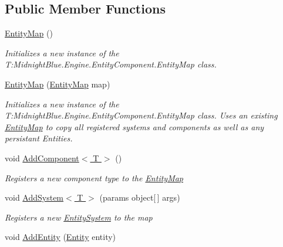 \subsection*{Public Member Functions}
\begin{DoxyCompactItemize}
\item 
\hyperlink{class_midnight_blue_1_1_engine_1_1_entity_component_1_1_entity_map_ad242ca713249280c914742d68f3c8ea4}{Entity\+Map} ()
\begin{DoxyCompactList}\small\item\em Initializes a new instance of the T\+:\+Midnight\+Blue.\+Engine.\+Entity\+Component.\+Entity\+Map class. \end{DoxyCompactList}\item 
\hyperlink{class_midnight_blue_1_1_engine_1_1_entity_component_1_1_entity_map_a7fc3f5c4ad9efde2dc878c19cf5040f5}{Entity\+Map} (\hyperlink{class_midnight_blue_1_1_engine_1_1_entity_component_1_1_entity_map}{Entity\+Map} map)
\begin{DoxyCompactList}\small\item\em Initializes a new instance of the T\+:\+Midnight\+Blue.\+Engine.\+Entity\+Component.\+Entity\+Map class. Uses an existing \hyperlink{class_midnight_blue_1_1_engine_1_1_entity_component_1_1_entity_map}{Entity\+Map} to copy all registered systems and components as well as any persistant Entities. \end{DoxyCompactList}\item 
void \hyperlink{class_midnight_blue_1_1_engine_1_1_entity_component_1_1_entity_map_aa4b52e535a775a3649416cb096a7c976}{Add\+Component$<$ T $>$} ()
\begin{DoxyCompactList}\small\item\em Registers a new component type to the \hyperlink{class_midnight_blue_1_1_engine_1_1_entity_component_1_1_entity_map}{Entity\+Map} \end{DoxyCompactList}\item 
void \hyperlink{class_midnight_blue_1_1_engine_1_1_entity_component_1_1_entity_map_a066bbf30c7ca22fea39c31355a2d8c71}{Add\+System$<$ T $>$} (params object\mbox{[}$\,$\mbox{]} args)
\begin{DoxyCompactList}\small\item\em Registers a new \hyperlink{class_midnight_blue_1_1_engine_1_1_entity_component_1_1_entity_system}{Entity\+System} to the map \end{DoxyCompactList}\item 
void \hyperlink{class_midnight_blue_1_1_engine_1_1_entity_component_1_1_entity_map_a206e9f0753dd0b417075d7bbe35f18d7}{Add\+Entity} (\hyperlink{class_midnight_blue_1_1_engine_1_1_entity_component_1_1_entity}{Entity} entity)

\end{DoxyCompactItemize}

